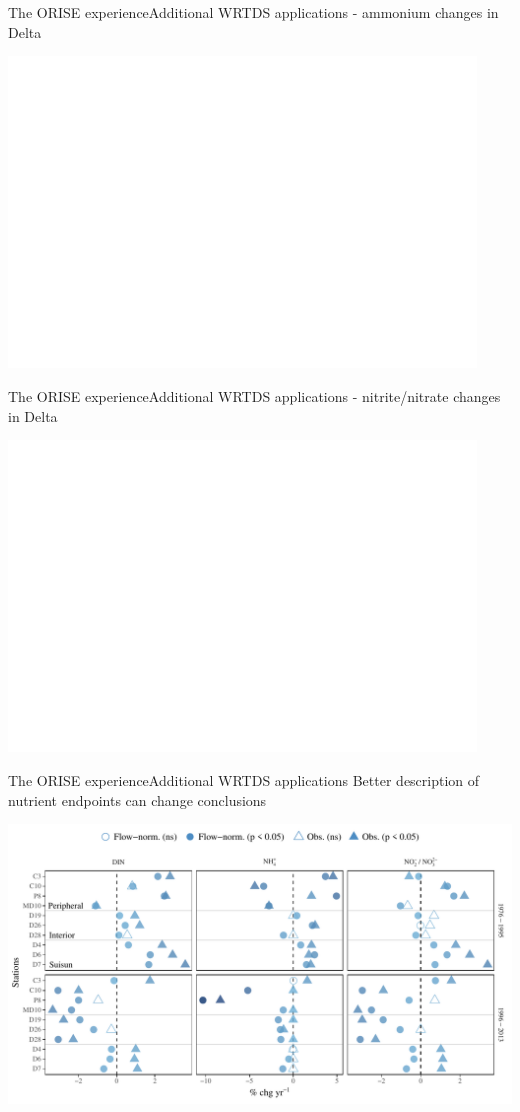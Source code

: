 \documentclass[serif]{beamer}\usepackage[]{graphicx}\usepackage[]{color}
\begin{document}
\begin{frame}{The ORISE experience}{Additional WRTDS applications - ammonium changes in Delta}
\centerline{\includegraphics[width = 0.93\textwidth, page = 2]{fig/trndspernh.pdf}}
\end{frame}

\begin{frame}{The ORISE experience}{Additional WRTDS applications - nitrite/nitrate changes in Delta}
\centerline{\includegraphics[width = 0.93\textwidth, page = 2]{fig/trndsperno23.pdf}}
\end{frame}

\begin{frame}{The ORISE experience}{Additional WRTDS applications}
Better description of nutrient endpoints can change conclusions
\centerline{\includegraphics[width = \textwidth]{fig/trndcomp1.pdf}}
\end{frame}
\end{document}
